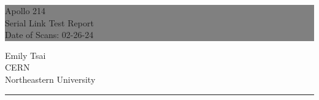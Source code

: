 \documentclass{report}
\newcommand\dateofscans{02-26-24} %
\begin{document}

\begin{titlepage} %


  \colorbox{grey}{
    \parbox[t]{0.93\textwidth}{ %
      \parbox[t]{0.91\textwidth}{ %
        \raggedleft %
        \fontsize{80pt}{40pt}\selectfont %
        \vspace{0.7cm} %

        Apollo 214\\
        Serial Link Test Report\\
        Date of Scans: \dateofscans\\

        \vspace{0.7cm} %
        }
      }
    }

  \vfill %


  \parbox[t]{0.93\textwidth}{ %
    \raggedleft %
    \large %
    {\Large Emily Tsai}\\[4pt] %
    CERN\\
    Northeastern University\\[4pt] %
    
    \hfill\rule{0.2\linewidth}{1pt}%
  }

\end{titlepage}

\hypertarget{MyToc}{}  %
\tableofcontents
\newpage
\end{document}

